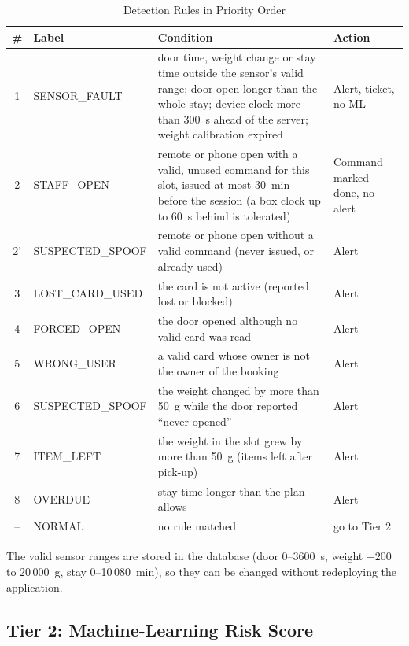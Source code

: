 \documentclass[conference, onecolumn]{IEEEtran}
\begin{document}
\begin{table}[H]
\renewcommand{\arraystretch}{1.3}
\centering
\caption{Detection Rules in Priority Order}
\label{tab:rules}
\begin{tabular}{c l p{8.2cm} l}
\hline
\textbf{\#} & \textbf{Label} & \textbf{Condition} & \textbf{Action} \\
\hline
1 & SENSOR\_FAULT & door time, weight change or stay time outside the sensor's valid range; door open longer than the whole stay; device clock more than 300~s ahead of the server; weight calibration expired & Alert, ticket, no ML \\
2 & STAFF\_OPEN & remote or phone open with a valid, unused command for this slot, issued at most 30~min before the session (a box clock up to 60~s behind is tolerated) & Command marked done, no alert \\
2' & SUSPECTED\_SPOOF & remote or phone open without a valid command (never issued, or already used) & Alert \\
3 & LOST\_CARD\_USED & the card is not active (reported lost or blocked) & Alert \\
4 & FORCED\_OPEN & the door opened although no valid card was read & Alert \\
5 & WRONG\_USER & a valid card whose owner is not the owner of the booking & Alert \\
6 & SUSPECTED\_SPOOF & the weight changed by more than 50~g while the door reported ``never opened'' & Alert \\
7 & ITEM\_LEFT & the weight in the slot grew by more than 50~g (items left after pick-up) & Alert \\
8 & OVERDUE & stay time longer than the plan allows & Alert \\
-- & NORMAL & no rule matched & go to Tier 2 \\
\hline
\end{tabular}
\end{table}

The valid sensor ranges are stored in the database (door 0--3600~s, weight $-200$ to 20\,000~g, stay 0--10\,080~min),
so they can be changed without redeploying the application.

\subsection{Tier 2: Machine-Learning Risk Score}
\label{sec:tier2}
\end{document}
